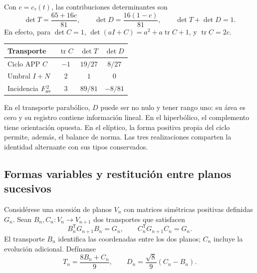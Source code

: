 Con \(c=c_\tau(t)\), las contribuciones determinantes son
\begin{equation}
 \det T=\frac{65+16c}{81},\qquad
 \det D=\frac{16(1-c)}{81},\qquad
 \det T+\det D=1.
\label{eul:eq:determinantes}
\end{equation}
En efecto, para \(\det C=1\),
\(\det(aI+C)=a^2+a\operatorname{tr}C+1\), y
\(\operatorname{tr}C=2c\).

\begin{tablacompleta}
\caption{Contribuciones al área orientada de tres transportes generados.}
\begin{tabular}{lccc}
\toprule
Transporte&\(\operatorname{tr}C\)&\(\det T\)&\(\det D\)\\
\midrule
Ciclo APP \(C\)&$-1$&$19/27$&$8/27$\\
Umbral \(I+N\)&$2$&$1$&$0$\\
Incidencia \(F_{\rm av}^2\)&$3$&$89/81$&$-8/81$\\
\bottomrule
\end{tabular}
\end{tablacompleta}

En el transporte parabólico, \(D\) puede ser no nulo y tener rango uno:
su área es cero y su registro contiene información lineal. En el
hiperbólico, el complemento tiene orientación opuesta. En el elíptico,
la forma positiva propia del ciclo permite, además, el balance de norma.
Las tres realizaciones comparten la identidad alternante con sus tipos
conservados.

\subsection{Formas variables y restitución entre planos sucesivos}
\label{eul:formas-variables}

Considérese una sucesión de planos \(V_n\) con matrices simétricas
positivas definidas \(G_n\). Sean
\(B_n,C_n:V_n\to V_{n+1}\) dos transportes que satisfacen
\[
 B_n^\mathsf TG_{n+1}B_n=G_n,
 \qquad C_n^\mathsf TG_{n+1}C_n=G_n.
\]
El transporte \(B_n\) identifica las coordenadas entre los dos planos;
\(C_n\) incluye la evolución adicional. Defínanse
\[
 T_n=\frac{8B_n+C_n}{9},\qquad
 D_n=\frac{\sqrt8}{9}(C_n-B_n).
\]

